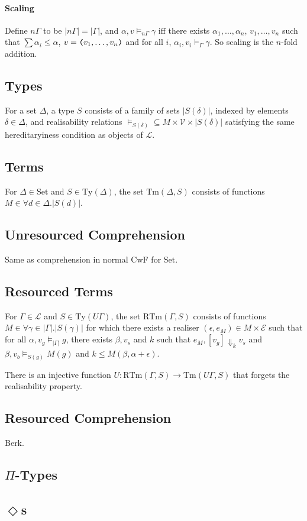 \documentclass{workingnote}
\newcommand{\Set}{\mathrm{Set}}
\newcommand{\cat}[1]{\mathcal{#1}}
\newcommand{\Ty}{\mathrm{Ty}}
\newcommand{\Tm}{\mathrm{Tm}}
\newcommand{\RTm}{\mathrm{RTm}}
\begin{document}
\paragraph{Scaling} Define $n\Gamma$ to be $|n\Gamma| = |\Gamma|$, and
$\alpha, v \models_{n\Gamma} \gamma$ iff there exists
$\alpha_1,\dots,\alpha_n$, $v_1,\dots,v_n$ such that
$\sum \alpha_i \leq \alpha$, $v = \texttt{(}v_1,\dots,v_n\texttt{)}$ and for all
$i$, $\alpha_i, v_i \models_\Gamma \gamma$. So scaling is the $n$-fold
addition.

\subsection{Types}

For a set $\Delta$, a type $S$ consists of a family of sets
$|S(\delta)|$, indexed by elements $\delta \in \Delta$, and
realisability relations
$\models_{S(\delta)} \subseteq M \times \mathcal{V} \times
|S(\delta)|$ satisfying the same hereditaryiness condition as objects
of $\cat{L}$.

\subsection{Terms}

For $\Delta \in \Set$ and $S \in \Ty(\Delta)$, the set $\Tm(\Delta,S)$
consists of functions $M \in \forall d \in \Delta. |S(d)|$.

\subsection{Unresourced Comprehension}

Same as comprehension in normal CwF for $\Set$.

\subsection{Resourced Terms}

For $\Gamma \in \cat{L}$ and $S \in \Ty(U\Gamma)$, the set
$\RTm(\Gamma, S)$ consists of functions
$M \in \forall \gamma \in |\Gamma|. |S(\gamma)|$ for which there
exists a realiser $(\epsilon, e_M) \in M \times \mathcal{E}$ such that
for all $\alpha, v_g \models_{|\Gamma|} g$, there exists $\beta, v_s$
and $k$ such that $e_M, [v_g] \Downarrow_k v_s$ and
$\beta, v_b \models_{S(g)} M(g)$ and
$k \leq M(\beta, \alpha + \epsilon)$.

There is an injective function
$U : \RTm(\Gamma, S) \to \Tm(U\Gamma, S)$ that forgets the
realisability property.

\subsection{Resourced Comprehension}

Berk.

\subsection{$\Pi$-Types}

\subsection{$\Diamond$s}
\end{document}
